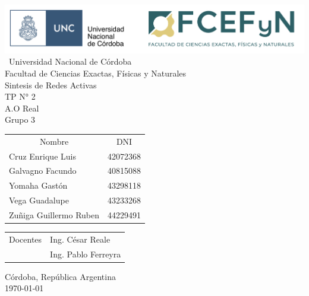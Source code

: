 \begin{titlepage}

\begin{center}
    \includegraphics[width=15cm]{img/color_UNC-FCEFyN.png}
    \\[1cm]
    \vspace{5pt}
    \ \LARGE Universidad Nacional de Córdoba\\[0.5cm] 
    \large Facultad de Ciencias Exactas, Físicas y Naturales \\[0.5cm] 
    \large Sintesis de Redes Activas
    \\[0.2cm]
    \large TP N° 2
    \\[0.2cm]
    \large A.O Real
    \\[0.2cm]
    \large Grupo 3
    \\[0.2cm]
    \vspace{60pt}
    \begin{table}[!h]
    \centering
    \begin{tabular}{ll}
    \multicolumn{1}{c}{Nombre} & \multicolumn{1}{c}{DNI} \\
    Cruz Enrique Luis & 42072368 \\
    Galvagno Facundo& 40815088 \\
    Yomaha Gastón & 43298118 \\
    Vega Guadalupe & 43233268 \\
    Zuñiga Guillermo Ruben & 44229491\\
    
    \end{tabular}
    \end{table}
    \vspace{20pt}
    \begin{table}[!h]
    \centering
    \begin{tabular}{ll}
    \multicolumn{1}{c}{Docentes} & Ing. César Reale \\
     & Ing. Pablo Ferreyra
    \end{tabular}
    \end{table}
    \vfill
    Córdoba, República Argentina\\
    \today
\end{center}

\end{titlepage}